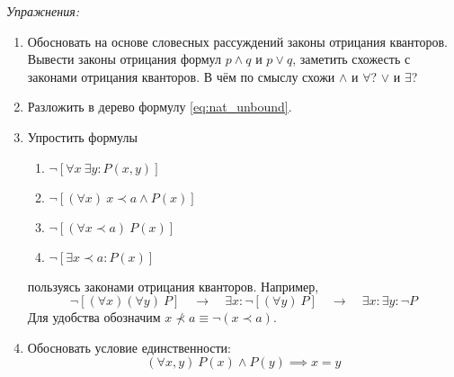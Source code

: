 \vspace{1em}
{\it Упражнения:}
\begin{enumerate}
  \item{}Обосновать на основе словесных рассуждений законы отрицания
  кванторов\label{ex:quantor_neg_def}. Вывести законы отрицания формул
  $p\land q$ и $p\lor q$, заметить схожесть с законами отрицания кванторов.
  В чём по смыслу схожи $\land$ и $\forall$? $\lor$ и $\exists$?

  \item{}Разложить в дерево формулу \eqref{eq:nat_unbound}.

  \item{}Упростить формулы
  \begin{multicols}{2}
    \begin{enumerate}
      \item{}$\lnot[\forall x~\exists y:P(x,y)]$
      \item{}$\lnot[(\forall x)~ x\prec a\land P(x)]$
      \item{}$\lnot[(\forall x\prec a)~P(x)]$
      \item{}$\lnot[\exists x\prec a:P(x)]$
    \end{enumerate}
  \end{multicols}
  пользуясь законами отрицания кванторов.
  Например,
  \[
    \lnot [(\forall x)(\forall y)~P]\quad\to\quad
    \exists x:\lnot [(\forall y)~P]\quad\to\quad
    \exists x:\exists y:\lnot P
  \]
  Для удобства обозначим $x\nprec a\equiv \lnot(x\prec a)$.

  \item{}Обосновать условие единственности:
  \[
    (\forall x,y)~P(x)\land P(y)\implies x=y
  \]
\end{enumerate}
